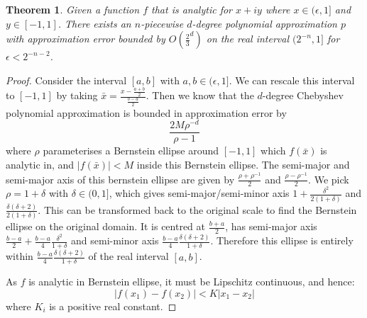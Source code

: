 \documentclass[aps]{revtex4-2}
\newtheorem{theorem}{Theorem}
\begin{document}
\begin{theorem}
    Given a function $f$ that is analytic for $x + iy$ where $x \in (\epsilon, 1]$ and $y \in [-1,1]$. There exists an $n$-piecewise $d$-degree polynomial approximation $p$ with approximation error bounded by $O(\frac{2}{3}^{d})$ on the real interval $(2^{-n}, 1]$ for $\epsilon < 2^{-n-2}$.
\end{theorem}
\begin{proof}
    Consider the interval $[a,b]$ with $a,b \in (\epsilon, 1]$. We can rescale this interval to $[-1,1]$ by taking $\bar x = \frac{x-\frac{a+b}{2}}{\frac{b-a}{2}}$. Then we know that the $d$-degree Chebyshev polynomial approximation is bounded in approximation error by
    \begin{equation}
        \frac{2M\rho^{-d}}{\rho -1}
    \end{equation}
    where $\rho$ parameterises a Bernstein ellipse around $[-1,1]$ which $f(\bar x)$ is analytic in, and $|f(\bar x)|<M$ inside this Bernstein ellipse. The semi-major and semi-major axis of this bernstein ellipse are given by $\frac{\rho + \rho^{-1}}{2}$ and $\frac{\rho - \rho^{-1}}{2}$. We pick $\rho = 1 + \delta$ with $\delta \in (0,1]$, which gives semi-major/semi-minor axis $1+\frac{\delta^2}{2(1+\delta)}$ and $\frac{\delta(\delta + 2)}{2(1+\delta)}$. This can be transformed back to the original scale to find the Bernstein ellipse on the original domain. It is centred at $\frac{b+a}{2}$, has semi-major axis $\frac{b-a}{2}+\frac{b-a}{4}\frac{\delta^2}{1+\delta}$ and semi-minor axis $\frac{b-a}{4}\frac{\delta(\delta + 2)}{1+\delta}$. Therefore this ellipse is entirely within $\frac{b-a}{4}\frac{\delta(\delta + 2)}{1+\delta}$ of the real interval $[a,b]$.

    As $f$ is analytic in Bernstein ellipse, it must be Lipschitz continuous, and hence:
    \begin{equation}
        |f(x_1) - f(x_2)| < K|x_1-x_2|
    \end{equation}
    where $K_i$ is a positive real constant. 
    

\end{proof}
\end{document}
